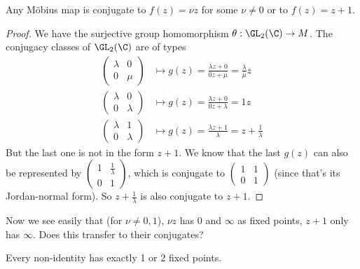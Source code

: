 \documentclass[a4paper]{article}
\begin{document}
\begin{prop}
  Any M\"obius map is conjugate to $f(z) = \nu z$ for some $\nu\not= 0$ or to $f(z) = z + 1$.
\end{prop}

\begin{proof}
  We have the surjective group homomorphism $\theta: \GL_2(\C) \to M$. The conjugacy classes of $\GL_2(\C)$ are of types
  \begin{align*}
    \begin{pmatrix}
      \lambda & 0\\
      0 & \mu
    \end{pmatrix} &\mapsto g(z) = \frac{\lambda z + 0}{0z + \mu} = \frac{\lambda}{\mu}z\\
    \begin{pmatrix}
      \lambda & 0\\
      0 & \lambda
    \end{pmatrix} &\mapsto g(z) = \frac{\lambda z + 0}{0z + \lambda} = 1 z\\
    \begin{pmatrix}
      \lambda & 1\\
      0 & \lambda
    \end{pmatrix} &\mapsto g(z) = \frac{\lambda z + 1}{\lambda} = z + \frac{1}{\lambda}
  \end{align*}
  But the last one is not in the form $z + 1$. We know that the last $g(z)$ can also be represented by $
  \begin{pmatrix}
    1 & \frac{1}{\lambda}\\
    0 & 1
  \end{pmatrix}$, which is conjugate to $
  \begin{pmatrix}
    1 & 1\\
    0 & 1
  \end{pmatrix}$ (since that's its Jordan-normal form). So $z + \frac{1}{\lambda}$ is also conjugate to $z + 1$.
\end{proof}

Now we see easily that (for $\nu \not= 0, 1$), $\nu z$ has $0$ and $\infty$ as fixed points, $z + 1$ only has $\infty$. Does this transfer to their conjugates?

\begin{prop}
  Every non-identity has exactly 1 or 2 fixed points.
\end{prop}
\end{document}
